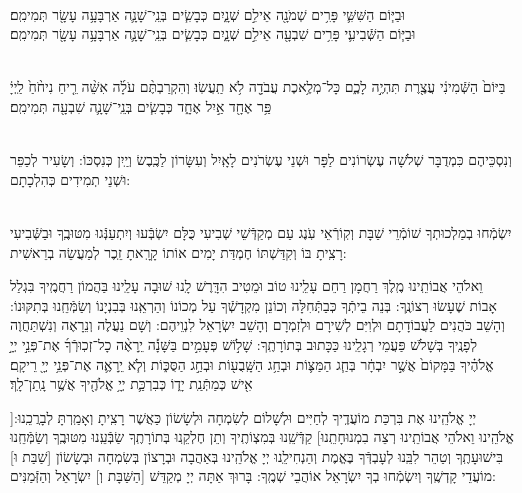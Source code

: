 \documentclass[twoside, openany, parskip=half, 11pt]{book}
\begin{document}

 \\
וּבַיּ֧וֹם  הַשִּׁשִּׁ֛י פָּרִ֥ים שְׁמֹנָ֖ה אֵילִ֣ם שְׁנָ֑יִם כְּבָשִׂ֧ים בְּנֵֽי־שָׁנָ֛ה אַרְבָּעָ֥ה עָשָׂ֖ר תְּמִימִֽם׃ 
\\
 וּבַיּ֧וֹם הַשְּֿׁבִיעִ֛י פָּרִ֥ים שִׁבְעָ֖ה אֵילִ֣ם שְׁנָ֑יִם כְּבָשִׂ֧ים בְּנֵֽי־שָׁנָ֛ה אַרְבָּעָ֥ה עָשָׂ֖ר תְּמִימִֽם׃ 


\\
בַּיּוֹם֙  הַשְּֿׁמִינִ֔י עֲצֶ֖רֶת תִּהְיֶ֣ה לָכֶ֑ם כָּל־מְלֶ֥אכֶת עֲבֹדָ֖ה לֹ֥א תַֽעֲשֽׂוּ׃ וְהִקְרַבְתֶּ֨ם עֹלָ֜ה אִשֵּׁ֨ה רֵ֤יחַ נִיחֹ֨חַ֙ לַֽיְיָ֔ פַּ֥ר אֶחָ֖ד אַ֣יִל אֶחָ֑ד כְּבָשִׂ֧ים בְּנֵֽי־שָׁנָ֛ה שִׁבְעָ֖ה תְּמִימִֽם׃

\\
 וְנִסְכֵּיהֶם כִּמְדֻבָּר שְׁלֹשָׁה עֶשְׂרוֹנִים לַפָּר וּשְׁנֵי עֶשְׂרֹנִים לָאָֽיִל וְעִשָּׂרוֹן לַכֶּֽבֶשׂ וְיַֽיִן כְּנִסְכּוֹ: וְשָׂעִיר לְכַפֵּר וּשְׁנֵי תְמִידִים כְּהִלְכָתָם:

\begin{sometimes}

\\
יִשְׂמְֿחוּ בְמַלְכוּתְךָ שׁוֹמְֿרֵי שַׁבָּת וְקֽוֹרְֿאֵי עֹֽנֶג עַם מְקַדְּֿשֵׁי שְׁבִיעִי כֻּלָּם יִשְׂבְּֿעוּ וְיִתְעַנְּֿגוּ מִטּוּבֶֽךָ וּבַשְּֿׁבִיעִי רָצִֽיתָ בּוֹ וְקִדַּשְׁתּוֹ חֶמְדַּת יָמִים אוֹתוֹ קָרָֽאתָ זֵֽכֶר לְמַעֲשֵׂה בְרֵאשִׁית:

\end{sometimes}


וֵאלֹהֵי אֲבוֹתֵֽינוּ מֶֽלֶךְ רַחֲמָן רַחֵם עָלֵֽינוּ טוֹב וּמֵטִיב הִדָּֽרֶשׁ לָֽנוּ שׁוּבָה עָלֵֽינוּ בַּהֲמוֹן רַחֲמֶֽיךָ בִּגְלַל אָבוֹת שֶׁעָשׂוּ רְצוֹנֶֽךָ: בְּנֵה בֵיתְֿךָ כְּבַתְּֿחִלָּה וְכוֹנֵן מִקְדָשְֿׁךָ עַל מְכוֹנוֹ וְהַרְאֵֽנוּ בְּבִנְיָנוֹ וְשַׂמְּֿחֵֽנוּ בְּתִקּוּנוֹ: וְהָשֵׁב כֹּהֲנִים לַעֲבוֹדָתָם וּלְוִיִּם לְשִׁירָם וּלְזִמְרָם וְהָשֵׁב יִשְׂרָאֵל לִנְוֵיהֶם: וְשָׁם נַעֲלֶה וְנֵרָאֶה וְנִשְׁתַּחֲוֶה לְפָנֶֽיךָ בְּשָׁלֹֹשׁ פַּעֲמֵי רְגָלֵֽינוּ כַּכָּתוּב בְּתוֹרָתֶֽךָ: 
שָׁלֹ֣וֹשׁ פְּעָמִ֣ים בַּשָּׁנָ֡ה יֵֽרָאֶ֨ה כָל־זְכֽוּרְֿךָ֜ אֶת־פְּנֵ֣י יְיָ֣ אֱלֹהֶ֗יךָ בַּמָּקוֹם֙ אֲשֶׁ֣ר יִבְחָ֔ר בְּחַ֧ג הַמַּצּ֛וֹת וּבְחַ֥ג הַשָּֽׁבֻע֖וֹת וּבְחַ֣ג הַסֻּכּ֑וֹת וְלֹ֧א יֵֽרָאֶ֛ה אֶת־פְּנֵ֥י יְיָ֖ רֵיקָֽם׃ אִ֖ישׁ כְּמַתְּֿנַֽת יָד֑וֹ כְּבִרְכַּ֛ת יְיָ֥ אֱלֹהֶ֖יךָ אֲשֶׁ֥ר נָֽתַן־לָֽךְ׃

	 יְיָ אֱלֹהֵֽינוּ אֶת בִּרְכַּת מוֹעֲדֶֽיךָ לְחַיִּים וּלְשָׁלוֹם לְשִׂמְחָה וּלְשָׂשׂוֹן כַּאֲשֶׁר רָצִֽיתָ וְאָמַֽרְתָּ לְבָרֲכֵֽנוּ:[ אֱלֹהֵֽינוּ וֵאלֹהֵי אֲבוֹתֵֽינוּ רְצֵה בִמְנוּחָתֵֽנוּ] קַדְּֿשֵֽׁנוּ בְּמִצְוֹתֶֽיךָ וְתֵן חֶלְקֵֽנוּ בְּתוֹרָתֶֽךָ שַׂבְּֿעֵֽנוּ מִטּוּבֶֽךָ וְשַׂמְּֿחֵֽנוּ בִּישׁוּעָתֶֽךָ וְטַהֵר לִבֵּֽנוּ לְעָבְדְּֿךָ בֶּאֱמֶת וְהַנְחִילֵֽנוּ יְיָ אֱלֹהֵֽינוּ בְּאַהֲבָה וּבְרָצוֹן בְּשִׂמְחָה וּבְשָׂשׂוֹן [שַׁבַּת וּ] מוֹעֲדֵי קָדְשֶֽׁךָ וְיִשְׂמְֿחוּ בְךָ יִשְׂרָאֵל אוֹהֲבֵי שְׁמֶֽךָ: בָּרוּךְ אַתָּה יְיָ מְקַדֵּשׁ [הַשַּׁבָּת וְ] יִשְׂרָאֵל וְהַזְּֿמַנִּים:
	
\end{document}
